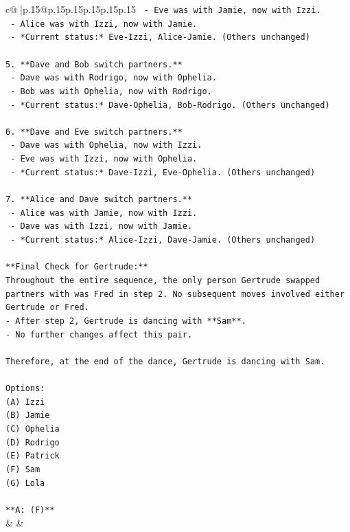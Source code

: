 \documentclass{article}
\begin{document}
{\begin{supertabular}{c@{$\;$}|p{.15\linewidth}@{}p{.15\linewidth}p{.15\linewidth}p{.15\linewidth}p{.15\linewidth}p{.15\linewidth}}
{{{\texttt{    {-} Eve was with Jamie, now with Izzi.} \\
\texttt{    {-} Alice was with Izzi, now with Jamie.} \\
\texttt{    {-} *Current status:* Eve{-}Izzi, Alice{-}Jamie. (Others unchanged)} \\
\\ 
\texttt{5.  **Dave and Bob switch partners.**} \\
\texttt{    {-} Dave was with Rodrigo, now with Ophelia.} \\
\texttt{    {-} Bob was with Ophelia, now with Rodrigo.} \\
\texttt{    {-} *Current status:* Dave{-}Ophelia, Bob{-}Rodrigo. (Others unchanged)} \\
\\ 
\texttt{6.  **Dave and Eve switch partners.**} \\
\texttt{    {-} Dave was with Ophelia, now with Izzi.} \\
\texttt{    {-} Eve was with Izzi, now with Ophelia.} \\
\texttt{    {-} *Current status:* Dave{-}Izzi, Eve{-}Ophelia. (Others unchanged)} \\
\\ 
\texttt{7.  **Alice and Dave switch partners.**} \\
\texttt{    {-} Alice was with Jamie, now with Izzi.} \\
\texttt{    {-} Dave was with Izzi, now with Jamie.} \\
\texttt{    {-} *Current status:* Alice{-}Izzi, Dave{-}Jamie. (Others unchanged)} \\
\\ 
\texttt{**Final Check for Gertrude:**} \\
\texttt{Throughout the entire sequence, the only person Gertrude swapped partners with was Fred in step 2. No subsequent moves involved either Gertrude or Fred.} \\
\texttt{{-} After step 2, Gertrude is dancing with **Sam**.} \\
\texttt{{-} No further changes affect this pair.} \\
\\ 
\texttt{Therefore, at the end of the dance, Gertrude is dancing with Sam.} \\
\\ 
\texttt{Options:} \\
\texttt{(A) Izzi} \\
\texttt{(B) Jamie} \\
\texttt{(C) Ophelia} \\
\texttt{(D) Rodrigo} \\
\texttt{(E) Patrick} \\
\texttt{(F) Sam} \\
\texttt{(G) Lola} \\
\\ 
\texttt{**A: (F)**} \\
            }
        }
    }
    & & \\ \\


\end{supertabular}}
\end{document}
